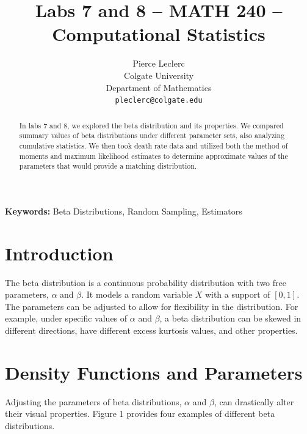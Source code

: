 \documentclass{article}\usepackage[]{graphicx}\usepackage[]{xcolor}
\begin{document}
\vspace{-1in}
\title{Labs 7 and 8 -- MATH 240 -- Computational Statistics}

\author{
  Pierce Leclerc \\
  Colgate University  \\
  Department of Mathematics  \\
  {\tt pleclerc@colgate.edu}
}

\date{}

\maketitle

\begin{multicols}{2}
\begin{abstract}
In labs 7 and 8, we explored the beta distribution and its properties. We compared summary values of beta distributions under different parameter sets, also analyzing cumulative statistics. We then took death rate data and utilized both the method of moments and maximum likelihood estimates to determine approximate values of the parameters that would provide a matching distribution.
\end{abstract}

\noindent \textbf{Keywords:} Beta Distributions, Random Sampling, Estimators 

\section{Introduction}
The beta distribution is a continuous probability distribution with two free parameters, $\alpha$ and $\beta$. It models a random variable $X$ with a support of $[0,1]$. The parameters can be adjusted to allow for flexibility in the distribution. For example, under specific values of $\alpha$ and $\beta$, a beta distribution can be skewed in different directions, have different excess kurtosis values, and other properties.

\section{Density Functions and Parameters}

Adjusting the parameters of beta distributions, $\alpha$ and $\beta$, can drastically alter their visual properties. Figure 1 provides four examples of different beta distributions.


\end{multicols}
\end{document}
